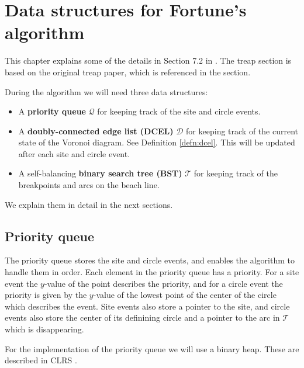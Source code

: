 \chapter{Data structures for Fortune's algorithm}

This chapter explains some of the details in Section 7.2 in \cite{CompGeo}. The treap section is based on the original treap paper, which is referenced in the section.

During the algorithm we will need three data structures:
\begin{itemize}
    \item A \textbf{priority queue} $\mathcal{Q}$ for keeping track of the site and circle events.
    \item A \textbf{doubly-connected edge list (DCEL)} $\mathcal{D}$ for keeping track of the current state of the Voronoi diagram. See Definition \ref{defn:dcel}. This will be updated after each site and circle event.
    \item A self-balancing \textbf{binary search tree (BST)} $\mathcal{T}$ for keeping track of the breakpoints and arcs on the beach line.
\end{itemize}
We explain them in detail in the next sections.

\section{Priority queue}
The priority queue stores the site and circle events, and enables the algorithm to handle them in order. Each element in the priority queue has a priority. For a site event the $y$-value of the point describes the priority, and for a circle event the priority is given by the $y$-value of the lowest point of the center of the circle which describes the event. Site events also store a pointer to the site, and circle events also store the center of its definining circle and a pointer to the arc in $\mathcal{T}$ which is disappearing.

For the implementation of the priority queue we will use a binary heap. These are described in CLRS \cite{CLRS}.


